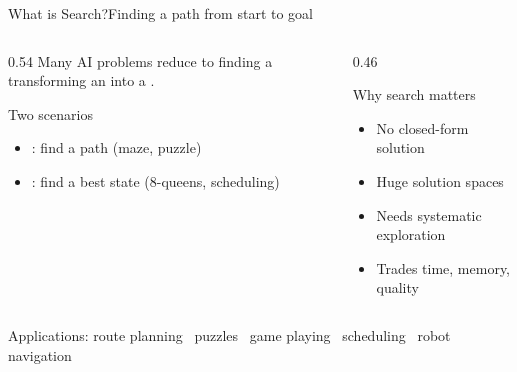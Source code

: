 \documentclass[aspectratio=169,11pt]{beamer}
\begin{document}
\begin{frame}{What is Search?}{Finding a path from start to goal}
  \begin{columns}[T]
    \begin{column}{0.54\textwidth}
      Many AI problems reduce to finding a 
      transforming an  into a .
      \vspace{0.4em}
      \begin{block}{Two scenarios}
        \small
        \begin{itemize}
          \item {}: find a path (maze, puzzle)
          \item {}: find a best state (8-queens, scheduling)
        \end{itemize}
      \end{block}
    \end{column}
    \begin{column}{0.46\textwidth}
      \begin{exampleblock}{Why search matters}
        \small
        \begin{itemize}
          \item No closed-form solution
          \item Huge solution spaces
          \item Needs systematic exploration
          \item Trades time, memory, quality
        \end{itemize}
      \end{exampleblock}
    \end{column}
  \end{columns}
  \vspace{0.3em}
  \begin{center}\scriptsize
    Applications: route planning \textbullet\ puzzles \textbullet\ game playing
    \textbullet\ scheduling \textbullet\ robot navigation
  \end{center}
\end{frame}
\end{document}
